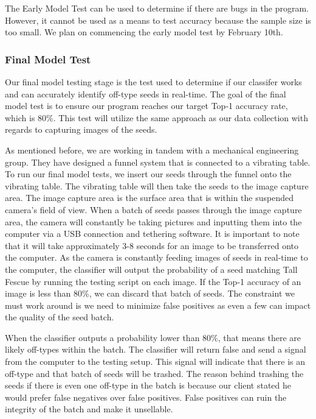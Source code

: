 \documentclass[onecolumn, draftclsnofoot,10pt, compsoc]{IEEEtran}
\begin{document}
The Early Model Test can be used to determine if there are bugs in the program. However, it cannot be used as a means to test accuracy because the sample size is too small. We plan on commencing the early model test by February 10th.  

\subsubsection{Final Model Test}

Our final model testing stage is the test used to determine if our classifer works and can accurately identify off-type seeds in real-time. The goal of the final model test is to ensure our program reaches our target Top-1 accuracy rate, which is 80\%. This test will utilize the same approach as our data collection with regards to capturing images of the seeds.

As mentioned before, we are working in tandem with a mechanical engineering group. They have designed a funnel system that is connected to a vibrating table. To run our final model tests, we insert our seeds through the funnel onto the vibrating table. The vibrating table will then take the seeds to the image capture area. The image capture area is the surface area that is within the suspended camera's field of view. When a batch of seeds passes through the image capture area, the camera will constantly be taking pictures and inputting them into the computer via a USB connection and tethering software. It is important to note that it will take approximately 3-8 seconds for an image to be transferred onto the computer. As the camera is constantly feeding images of seeds in real-time to the computer, the classifier will output the probability of a seed matching Tall Fescue by running the testing script on each image. If the Top-1 accuracy of an image is less than 80\%, we can discard that batch of seeds. The constraint we must work around is we need to minimize false positives as even a few can impact the quality of the seed batch. 

When the classifier outputs a probability lower than 80\%, that means there are likely off-types within the batch. The classifier will return false and send a signal from the computer to the testing setup. This signal will indicate that there is an off-type and that batch of seeds will be trashed. The reason behind trashing the seeds if there is even one off-type in the batch is because our client stated he would prefer false negatives over false positives. False positives can ruin the integrity of the batch and make it unsellable. 
\end{document}
